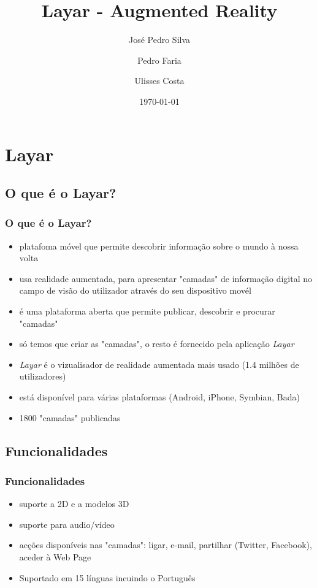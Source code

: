 \documentclass{beamer}
\title{Layar - Augmented Reality}
\author{José Pedro Silva \and
Pedro Faria \and
Ulisses Costa
}
\date{\today}
\institute{Engenharia de Linguagens\\
Processamento Estruturado de Documentos
}
\begin{document}
\begin{frame}
   \titlepage
\end{frame}


\section{Layar}
\subsection{O que é o Layar?}
\begin{frame} \frametitle{O que é o Layar?}
\begin{itemize}
\pause \item platafoma móvel que permite descobrir informação sobre o mundo à nossa volta
\pause \item usa realidade aumentada, para apresentar "camadas" de informação digital no campo  de visão do utilizador através do seu dispositivo movél
\pause \item é uma plataforma aberta que permite publicar, descobrir e procurar "camadas"
\pause \item só temos que criar as "camadas", o resto é fornecido pela aplicação \textit{Layar}
\pause \item \textit{Layar} é o vizualisador de realidade aumentada mais usado (1.4 milhões de utilizadores)
\pause \item está disponível para várias plataformas (Android, iPhone, Symbian, Bada)
\pause \item 1800 "camadas" publicadas
\end{itemize}
\end{frame}

\subsection{Funcionalidades}
\begin{frame} \frametitle{Funcionalidades}
\begin{itemize}
\pause \item suporte a  2D e a modelos 3D
\pause \item suporte para audio/vídeo
\pause \item acções disponíveis nas "camadas": ligar, e-mail, partilhar (Twitter, Facebook), aceder à Web Page  
\pause \item Suportado em 15 línguas incuindo o Português
\end{itemize}
\end{frame}
\end{document}
